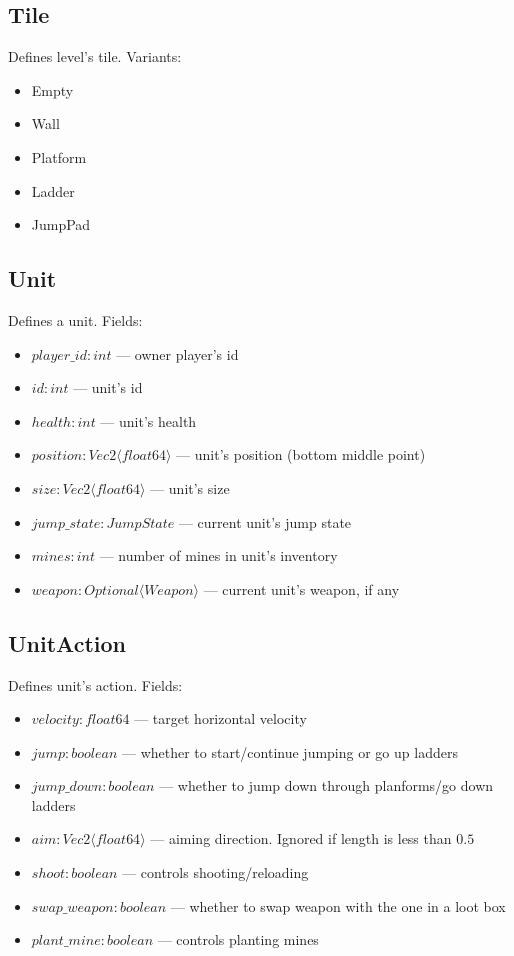 \subsection{Tile}
Defines level's tile. Variants:
\begin{itemize}
    \item Empty
    \item Wall
    \item Platform
    \item Ladder
    \item JumpPad
\end{itemize}

\subsection{Unit}
Defines a unit. Fields:
\begin{itemize}
    \item $player\_id : int$ --- owner player's id
    \item $id : int$ --- unit's id
    \item $health : int$ --- unit's health
    \item $position : Vec2 \langle float64 \rangle$ --- unit's position (bottom middle point)
    \item $size : Vec2 \langle float64 \rangle$ --- unit's size
    \item $jump\_state : JumpState$ --- current unit's jump state
    \item $mines : int$ --- number of mines in unit's inventory
    \item $weapon : Optional \langle Weapon \rangle$ --- current unit's weapon, if any
\end{itemize}

\subsection{UnitAction}
Defines unit's action. Fields:
\begin{itemize}
    \item $velocity : float64$ --- target horizontal velocity
    \item $jump : boolean$ --- whether to start/continue jumping or go up ladders
    \item $jump\_down : boolean$ --- whether to jump down through planforms/go down ladders
    \item $aim : Vec2 \langle float64 \rangle$ --- aiming direction. Ignored if length is less than $0.5$
    \item $shoot : boolean$ --- controls shooting/reloading
    \item $swap\_weapon : boolean$ --- whether to swap weapon with the one in a loot box
    \item $plant\_mine : boolean$ --- controls planting mines
\end{itemize}

